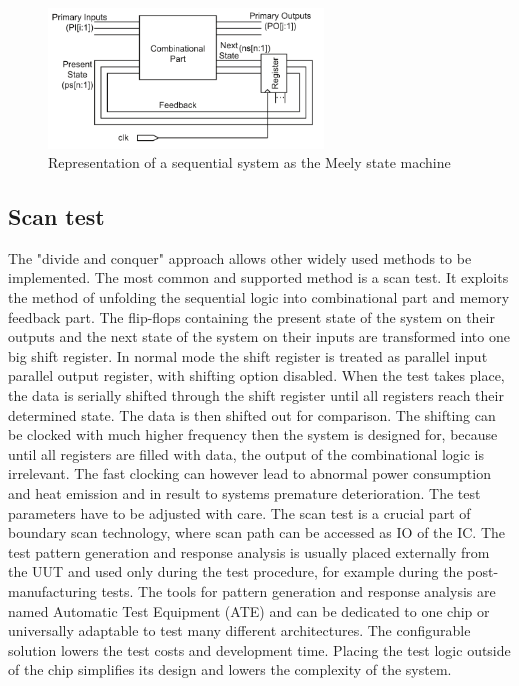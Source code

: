 \begin{figure}[H]
\centering
\includegraphics[width=0.65\textwidth]{figures/Meely.PNG}
\caption{Representation of a sequential system as the Meely state machine \cite{book:Navabi}}
\label{fig:Meely}
\end{figure}

\subsection{Scan test}
The "divide and conquer" approach allows other widely used methods to be implemented. The most common and supported method is a scan test. It exploits the method of unfolding the sequential logic into combinational part and memory feedback part. The flip-flops containing the present state of the system on their outputs and the next state of the system on their inputs are transformed into one big shift register. In normal mode the shift register is treated as parallel input parallel output register, with shifting option disabled. When the test takes place, the data is serially shifted through the shift register until all registers reach their determined state. The data is then shifted out for comparison. The shifting can be clocked with much higher frequency then the system is designed for, because until all registers are filled with data, the output of the combinational logic is irrelevant. The fast clocking can however lead to abnormal power consumption and heat emission and in result to systems premature deterioration. The test parameters have to be adjusted with care. The scan test is a crucial part of boundary scan technology, where scan path can be accessed as IO of the IC. The test pattern generation and response analysis is usually placed externally from the UUT and used only during the test procedure, for example during the post-manufacturing tests. The tools for pattern generation and response analysis are named Automatic Test Equipment (ATE) and can be dedicated to one chip or universally adaptable to test many different architectures. The configurable solution lowers the test costs and development time. Placing the test logic outside of the chip simplifies its design and lowers the complexity of the system.

